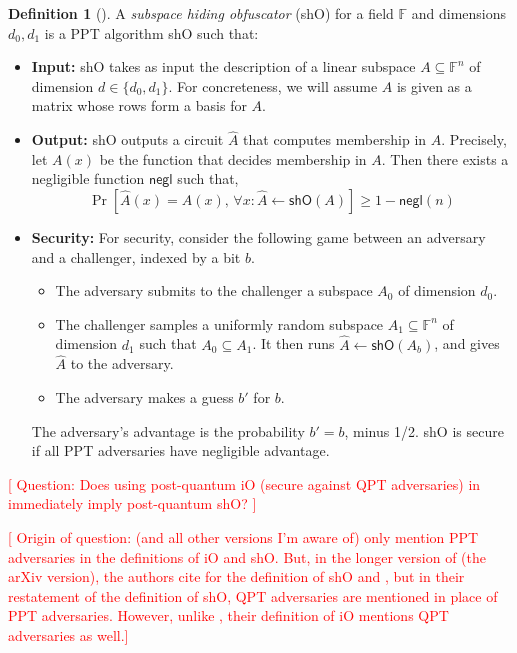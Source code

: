 \documentclass[12pt,letterpaper]{article}
\newcommand{\pynote}[1]{\textcolor{red}{[#1]}}
\theoremstyle{definition}
\newtheorem{defn}[theorem]{Definition}
\theoremstyle{remark}
\begin{document}
\begin{defn}[\cite{Zha19}]
A \emph{subspace hiding obfuscator} (\textsf{shO}) for a field $\mathbb{F}$ and dimensions $d_0,d_1$ is a PPT algorithm \textsf{shO} such that:
\begin{itemize}
    \item \textbf{Input:} \textsf{shO} takes as input the description of a linear subspace $A \subseteq \mathbb{F}^n$ of dimension ${d \in \{d_0,d_1\}}$. For concreteness, we will assume $A$ is given as a matrix whose rows form a basis for $A$.
    \item \textbf{Output:} \textsf{shO} outputs a circuit $\hat{A}$ that computes membership in $A$. Precisely, let $A(x)$ be the function that decides membership in $A$. Then there exists a negligible function $\textsf{negl}$ such that,
    \begin{equation*}
        \Pr[\hat{A}(x)=A(x), \, \forall x: \hat{A} \leftarrow \textsf{shO}(A)] \geq 1-\textsf{negl}(n)
    \end{equation*}
    \item \textbf{Security:} For security, consider the following game between an adversary and a challenger, indexed by a bit $b$.
    \begin{itemize}
        \item The adversary submits to the challenger a subspace $A_0$ of dimension $d_0$.
        \item The challenger samples a uniformly random subspace $A_1 \subseteq \mathbb{F}^n$ of dimension $d_1$ such that $A_0 \subseteq A_1$. It then runs $\hat{A} \leftarrow \textsf{shO}(A_b)$, and gives $\hat{A}$ to the adversary.
        \item The adversary makes a guess $b'$ for $b$.
    \end{itemize}
    The adversary's advantage is the probability $b'=b$, minus 1/2. \textsf{shO} is secure if all PPT adversaries have negligible advantage.
\end{itemize}
\end{defn}

\pynote{
Question: Does using post-quantum iO (secure against QPT adversaries) in  immediately imply post-quantum \textsf{shO}? 
}

\pynote{
Origin of question: \cite{Zha19} (and all other versions I'm aware of) only mention PPT adversaries in the definitions of \textsf{iO} and \textsf{shO}. But, in the longer version of \cite{CLLZ21} (the arXiv version), the authors cite \cite{Zha19} for the definition of \textsf{shO} and \Cref{shOconstruction}, but in their restatement of the definition of \textsf{shO}, QPT adversaries are mentioned in place of PPT adversaries. However, unlike \cite{Zha19}, their definition of \textsf{iO} mentions QPT adversaries as well.}
\end{document}
